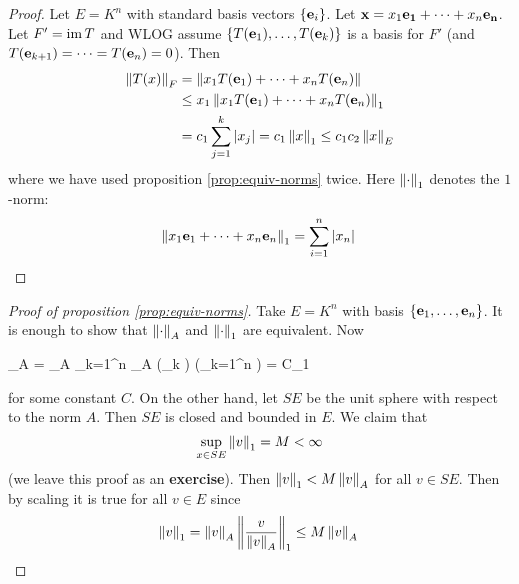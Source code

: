 \begin{proof}
	Let $E=K^n$ with standard basis vectors $\{\mathbf{e}_i\}$.
	Let $\mathbf{x} = x_1 \mathbf{e_1} + \cdots + x_n \mathbf{e_n}$.
	Let $F' = \operatorname{im} T$ and WLOG assume $\{T(\mathbf{e}_1),\ldots,T(\mathbf{e}_k)\}$ is a basis for $F'$ (and $T(\mathbf{e}_{k+1})=\cdots=T(\mathbf{e}_n)=0$).
	Then
	\begin{align*}
		\left\lVert T(x) \right\rVert_F &= \left\lVert x_1T(\mathbf{e}_1)+\cdots+x_nT(\mathbf{e}_n) \right\rVert \\
		&\leq x_1 \left\lVert x_1T(\mathbf{e}_1)+\cdots+x_nT(\mathbf{e}_n) \right\rVert_1 \\
		&= c_1 \sum_{j=1}^k \left\lvert x_j \right\rvert = c_1 \left\lVert x \right\rVert_1 \leq c_1c_2 \left\lVert x \right\rVert_E
	\end{align*}
	where we have used proposition \ref{prop:equiv-norms} twice.
	Here $\left\lVert \cdot \right\rVert_1$ denotes the $1$-norm:
	\[\left\lVert x_1\mathbf{e}_1+\cdots+x_n\mathbf{e}_n \right\rVert_1 = \sum_{i=1}^n \left\lvert x_n \right\rvert \qedhere\]
\end{proof}

\begin{proof}[Proof of proposition \ref{prop:equiv-norms}]
	Take $E=K^n$ with basis $\{\mathbf{e}_1,\ldots,\mathbf{e}_n\}$.
	It is enough to show that $\left\lVert \cdot \right\rVert_A$ and $\left\lVert \cdot \right\rVert_1$ are equivalent.
	Now
	\begin{eqn*}
		_A = _A \leq \sum_{k=1}^n  _A \leq \left(\max_{k \in [n]} \right) \left(\sum_{k=1}^n \right) = C_1
	\end{eqn*}
	for some constant $C$.
	On the other hand, let $SE$ be the unit sphere with respect to the norm $A$.
	Then $SE$ is closed and bounded in $E$.
	We claim that
	\[\sup_{x \in SE} \left\lVert v \right\rVert_1 = M < \infty\]
	(we leave this proof as an \textbf{exercise}).
	Then $\left\lVert v \right\rVert_1<M\left\lVert v \right\rVert_A$ for all $v \in SE$.
	Then by scaling it is true for all $v \in E$ since
	\[\left\lVert v \right\rVert_1 = \left\lVert v \right\rVert_A \left\lVert \frac{v}{\left\lVert v \right\rVert_A} \right\rVert_1 \leq M\left\lVert v \right\rVert_A \qedhere\]
\end{proof}